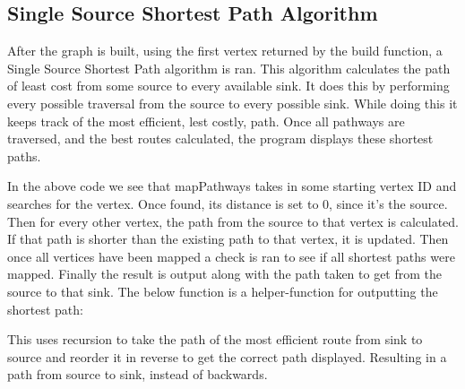 \documentclass[12pt, letterpaper]{article}
\begin{document}
\subsection{Single Source Shortest Path Algorithm} \label{Graph_SSSP}
After the graph is built, using the first vertex returned by the build function, a Single Source Shortest Path algorithm is ran.
This algorithm calculates the path of least cost from some source to every available sink.
It does this by performing every possible traversal from the source to every possible sink.
While doing this it keeps track of the most efficient, lest costly, path.
Once all pathways are traversed, and the best routes calculated, the program displays these shortest paths.
\begin{center}
   
\end{center}
In the above code we see that mapPathways takes in some starting vertex ID and searches for the vertex.
Once found, its distance is set to 0, since it's the source.
Then for every other vertex, the path from the source to that vertex is calculated.
If that path is shorter than the existing path to that vertex, it is updated.
Then once all vertices have been mapped a check is ran to see if all shortest paths were mapped.
Finally the result is output along with the path taken to get from the source to that sink.
\vspace*{5px}
\newline
The below function is a helper-function for outputting the shortest path:
\begin{center}
   
\end{center}
This uses recursion to take the path of the most efficient route from sink to source and reorder it in reverse to get the correct path displayed.
Resulting in a path from source to sink, instead of backwards.
\end{document}
